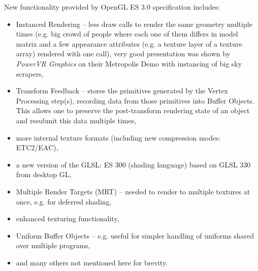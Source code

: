 New functionality provided by OpenGL ES 3.0 specification includes:
\begin{itemize}
\item Instanced Rendering – less draw calls to render the same geometry multiple times (e.g. big crowd of people where each one of them differs in model matrix and a few appearance attributes (e.g. a texture layer of a texture array) rendered with one call), very good presentation was shown by \emph{PowerVR Graphics} \cite{powervr_graphics} on their Metropolis Demo \cite{powervr_metropolis} with instancing of big sky scrapers,
\item Transform Feedback – stores the primitives generated by the Vertex Processing step(s), recording data from those primitives into Buffer Objects.
This allows one to preserve the post-transform rendering state of an object and resubmit this data multiple times,
\item more internal texture formats (including new compression modes: ETC2/EAC),
\item a new version of the GLSL: ES 300 (shading language) based on GLSL 330 from desktop GL,
\item Multiple Render Targets (MRT) – needed to render to multiple textures at once, e.g. for deferred shading,
\item enhanced texturing functionality,
\item Uniform Buffer Objects – e.g. useful for simpler handling of uniforms shared over multiple programs,
\item and many others not mentioned here for brevity.
\end{itemize}